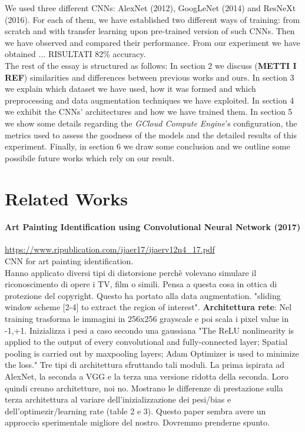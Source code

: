 \documentclass{article}
\begin{document}
We used three different CNNs: AlexNet (2012), GoogLeNet (2014) and ResNeXt (2016). For each of them, we have established two different ways of training: from scratch and with transfer learning  upon pre-trained version of such CNNs. Then we have observed and compared their performance. From our experiment we have obtained ... RISULTATI 82\% accuracy.\\

The rest of the essay is structured as follows: In section 2 we discuss (\textbf{METTI I REF}) similarities and differences between previous works and ours. In section 3 we explain which dataset we have used, how it was formed and which preprocessing and data augmentation techniques we have exploited. In section 4 we exhibit the CNNs' architectures and how we have trained them. In section 5 we show some details regarding the \textit{GCloud Compute Engine}'s configuration, the metrics used to assess the goodness of the models and the detailed results of this experiment. Finally, in section 6 we draw some conclusion and we outline some possibile future works which rely on our result.


\section{Related Works}

\paragraph{Art Painting Identification using Convolutional Neural Network (2017)}
\url{https://www.ripublication.com/ijaer17/ijaerv12n4_17.pdf}\\
CNN for art painting identification.\\ Hanno applicato diversi tipi di distorsione perchè volevano simulare il riconoscimento di opere i TV, film o simili. Pensa a questa cosa in ottica di protezione del copyright. Questo ha portato alla data augmentation. "sliding window scheme [2-4] to extract the region of interest".
\textbf{Architettura rete}: Nel training trasforma le immagini in 256x256 grayscale e poi scala i pixel value in -1,+1.  Inizializza i pesi a caso secondo una gaussiana "The ReLU nonlinearity is applied to the output of every convolutional and
fully-connected layer; Spatial pooling is carried out by maxpooling layers; Adam Optimizer is used to minimize the loss." Tre tipi di architettura sfruttando tali moduli. La prima ispirata ad AlexNet, la seconda a VGG e la terza una versione ridotta della seconda. Loro quindi creano architetture, noi no.
Mostrano le differenze di prestazione sulla terza architettura al variare dell'inizializzazione dei pesi/bias e dell'optimezir/learning rate (table 2 e 3). Questo paper sembra avere un approccio sperimentale migliore del nostro. Dovremmo prenderne spunto.
\end{document}
